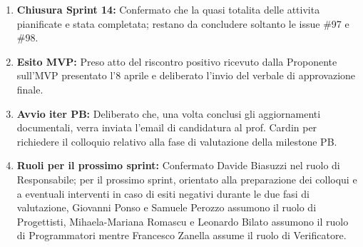 \documentclass[a4paper, 11pt, oneside]{scrartcl}
\begin{document}
\begin{enumerate}
	\item \textbf{Chiusura Sprint 14:} Confermato che la quasi totalita delle attivita pianificate e stata completata; restano da concludere soltanto le issue \#97 e \#98.
	\item \textbf{Esito MVP:} Preso atto del riscontro positivo ricevuto dalla Proponente sull'MVP presentato l'8 aprile e deliberato l'invio del verbale di approvazione finale.
	\item \textbf{Avvio iter PB:} Deliberato che, una volta conclusi gli aggiornamenti documentali, verra inviata l'email di candidatura al prof. Cardin per richiedere il colloquio relativo alla fase di valutazione della milestone PB.
	\item \textbf{Ruoli per il prossimo sprint:} Confermato Davide Biasuzzi nel ruolo di Responsabile; per il prossimo sprint, orientato alla preparazione dei colloqui e a eventuali interventi in caso di esiti negativi durante le due fasi di valutazione, Giovanni Ponso e Samuele Perozzo assumono il ruolo di Progettisti, Mihaela-Mariana Romascu e Leonardo Bilato assumono il ruolo di Programmatori mentre Francesco Zanella assume il ruolo di Verificatore.
\end{enumerate}
\end{document}
